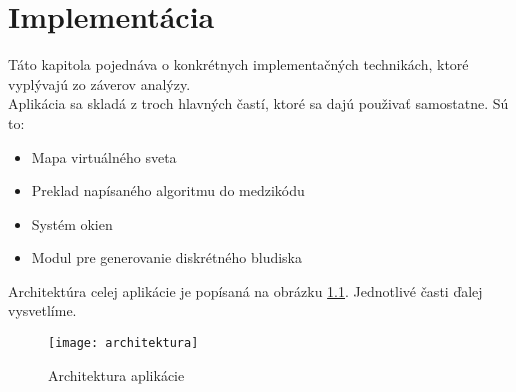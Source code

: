 \chapter{Implementácia} 
Táto kapitola pojednáva o konkrétnych implementačných technikách, ktoré vyplývajú zo záverov analýzy. \\
Aplikácia sa skladá z troch hlavných častí, ktoré sa dajú použivať samostatne. Sú to:
\begin{itemize}
\item Mapa virtuálného sveta %
\item Preklad napísaného algoritmu do medzikódu
\item Systém okien 
\item Modul pre generovanie diskrétného bludiska
\end{itemize}

Architektúra celej aplikácie je popísaná na obrázku \ref{fig::architektura}. Jednotlivé časti ďalej vysvetlíme.
\begin{figure}
\caption{Architektura aplikácie}
\centering
\texttt{[image: architektura]}
\label{fig::architektura}
\end{figure}

